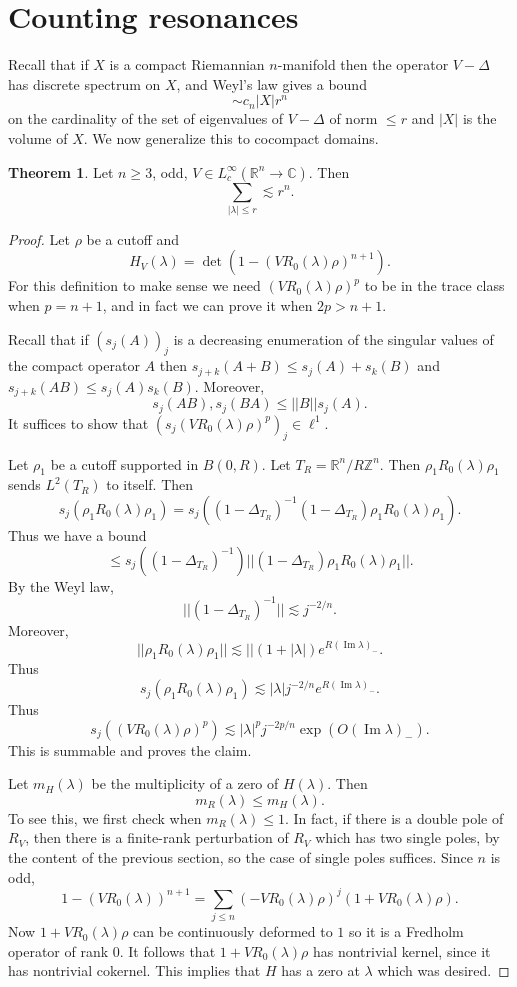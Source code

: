 \documentclass[12pt]{report}
\newcommand{\ZZ}{\mathbb{Z}}
\newcommand{\RR}{\mathbb{R}}
\newcommand{\CC}{\mathbb{C}}
\renewcommand{\Im}{\operatorname{Im}}
\theoremstyle{definition}
\newtheorem{theorem}{Theorem}[chapter]
\begin{document}
\section{Counting resonances}
Recall that if $X$ is a compact Riemannian $n$-manifold then the operator $V - \Delta$ has discrete spectrum on $X$, and Weyl's law gives a bound
$$\sim c_n |X| r^n$$
on the cardinality of the set of eigenvalues of $V - \Delta$ of norm $\leq r$ and $|X|$ is the volume of $X$.
We now generalize this to cocompact domains.

\begin{theorem}
Let $n \geq 3$, odd, $V \in L^\infty_c(\RR^n \to \CC)$. Then
$$\sum_{|\lambda| \leq r} \lesssim r^n.$$
\end{theorem}
\begin{proof}
Let $\rho$ be a cutoff and
$$H_V(\lambda) = \det(1 - (VR_0(\lambda)\rho)^{n+1}).$$
For this definition to make sense we need $(VR_0(\lambda)\rho)^p$ to be in the trace class when $p = n + 1$, and in fact we can prove it when $2p > n + 1$.

Recall that if $(s_j(A))_j$ is a decreasing enumeration of the singular values of the compact operator $A$ then $s_{j+k}(A+B) \leq s_j(A) + s_k(B)$ and $s_{j+k}(AB) \leq s_j(A)s_k(B)$. Moreover,
$$s_j(AB),s_j(BA) \leq ||B||s_j(A).$$
It suffices to show that $(s_j(VR_0(\lambda)\rho)^p)_j \in \ell^1$.

Let $\rho_1$ be a cutoff supported in $B(0, R)$. Let $T_R = \RR^n/R\ZZ^n$. Then $\rho_1 R_0(\lambda) \rho_1$ sends $L^2(T_R)$ to itself. Then
$$s_j(\rho_1 R_0(\lambda) \rho_1) = s_j((1 - \Delta_{T_R})^{-1}(1 - \Delta_{T_R})\rho_1 R_0(\lambda)\rho_1).$$
Thus we have a bound
$$\leq s_j((1 - \Delta_{T_R})^{-1})||(1 - \Delta_{T_R})\rho_1 R_0(\lambda) \rho_1||.$$
By the Weyl law,
$$||(1 - \Delta_{T_R})^{-1}|| \lesssim j^{-2/n}.$$
Moreover,
$$||\rho_1 R_0(\lambda) \rho_1|| \lesssim ||(1 + |\lambda|)e^{R(\Im \lambda)_-}.$$
Thus
$$s_j(\rho_1 R_0(\lambda) \rho_1) \lesssim |\lambda|j^{-2/n}e^{R(\Im \lambda)_-}.$$
Thus
$$s_j((VR_0(\lambda)\rho)^p) \lesssim |\lambda|^pj^{-2p/n}\exp(O(\Im \lambda)_-).$$
This is summable and proves the claim.

Let $m_H(\lambda)$ be the multiplicity of a zero of $H(\lambda)$. Then
$$m_R(\lambda) \leq m_H(\lambda).$$
To see this, we first check when $m_R(\lambda) \leq 1$. In fact, if there is a double pole of $R_V$, then there is a finite-rank perturbation of $R_V$ which has two single poles, by the content of the previous section, so the case of single poles suffices.
Since $n$ is odd,
$$1 - (VR_0(\lambda))^{n+1} = \sum_{j \leq n} (-VR_0(\lambda)\rho)^j (1 + VR_0(\lambda)\rho).$$
Now $1 + VR_0(\lambda)\rho$ can be continuously deformed to $1$ so it is a Fredholm operator of rank $0$.
It follows that $1 + VR_0(\lambda)\rho$ has nontrivial kernel, since it has nontrivial cokernel.
This implies that $H$ has a zero at $\lambda$ which was desired.


\end{proof}
\end{document}
